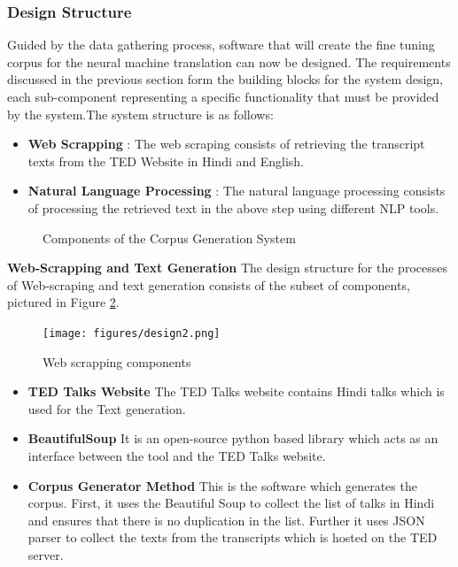 \subsubsection{Design Structure}

Guided by the data gathering process, software that will create the fine tuning corpus for the neural machine translation can now be designed. The requirements discussed in the previous section form the building blocks for the system design, each sub-component representing a specific functionality that must be provided by the system.The system structure is as follows:

\begin{itemize}
    \item \textbf{Web Scrapping} : The web scraping consists of retrieving the transcript texts from the TED Website in Hindi and English.
    \item \textbf{Natural Language Processing} : The natural language processing consists of processing the retrieved text in the above step using different NLP tools.
\end{itemize}

\begin{figure}[!h]
\caption{Components of the Corpus Generation System} \label{design1}
\end{figure}

\textbf{Web-Scrapping and Text Generation}
The design structure for the processes of Web-scraping and text generation consists of the subset of components, pictured in Figure \ref{design2}.

\begin{figure}[h]
\texttt{[image: figures/design2.png]}
\caption{Web scrapping components} \label{design2}
\end{figure}

\begin{itemize}
    \item \textbf{TED Talks Website} The TED Talks website contains Hindi talks which is used for the Text generation.
    \item \textbf{BeautifulSoup} It is an open-source python based library which acts as an interface between the tool and the TED Talks website.
    \item \textbf{Corpus Generator Method} This is the software which generates the corpus. First, it uses the Beautiful Soup to collect the list of talks in Hindi and ensures that there is no duplication in the list. Further it uses JSON parser to collect the texts from the transcripts which is hosted on the TED server.
\end{itemize}


